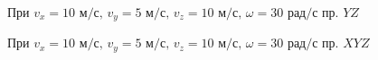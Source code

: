 \documentclass[a5paper, 10pt]{article}
\theoremstyle{definition}
\theoremstyle{plain}
\theoremstyle{remark}
\begin{document}
\begin{figure}[!h]
	           \caption{При $v_x = 10 \text{ м/с}, \, v_y = 5  \text{ м/с}, \, v_z = 10  \text{ м/с}, \, \omega = 30 \text{ рад/с}$ пр. $YZ$}
\end{figure}

\begin{figure}[!h]
	           \caption{При $v_x = 10 \text{ м/с}, \, v_y = 5  \text{ м/с}, \, v_z = 10  \text{ м/с}, \, \omega = 30 \text{ рад/с}$ пр. $XYZ$}
\end{figure}
\end{document}
